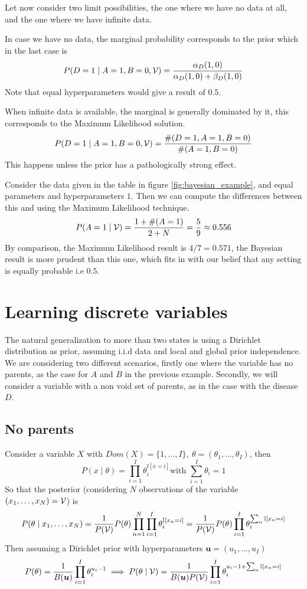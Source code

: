 Let now consider two limit possibilities, the one where we have no data at all,
and the one where we have infinite data.

In case we have no data, the marginal probability corresponds to the prior which
in the last case is
\[
   P(D = 1 \mid A = 1, B = 0, \mathcal{V}) = \frac{\alpha_{D}(1,0)}{\alpha_{D}(1,0) + \beta_{D}(1,0)}
 \]
 Note that equal hyperparameters would give a result of \(0.5\).

 When infinite data is available, the marginal is generally dominated by it,
 this corresponds to the Maximum Likelihood solution.
 \[
   P(D = 1 \mid A = 1, B = 0, \mathcal{V}) = \frac{\#(D = 1, A = 1 , B = 0)}{\#(A = 1, B = 0)}
 \]
 This happens unless the prior has a pathologically strong effect.

 Consider the data given in the table in figure \ref{fig:bayesian_example}, and
 equal parameters and hyperparameters \(1\). Then we can compute the differences
 between this and using the Maximum Likelihood technique.
 \[
   P(A = 1 \mid \mathcal{V}) = \frac{1 + \#(A = 1)}{2 + N} = \frac{5}{9} \approx 0.556
 \]
 By comparison, the Maximum Likelihood result is \(4/7 = 0.571\), the Bayesian
 result is more prudent than this one, which fits in with our belief that any
 setting is equally probable i.e \(0.5\).

 \section{Learning discrete variables}

 The natural generalization to more than two states is using a Dirichlet
 distribution as prior, assuming i.i.d data and local and global prior
 independence. We are considering two different scenarios, firstly one where the
 variable has no parents, as the case for \(A\) and \(B\) in the previous
 example. Secondly, we will consider a variable with a non void set of parents,
 as in the case with the disease \(D\).

 \subsection{No parents}

 Consider a variable \(X\) with
 \(Dom(X) = \{1, \dots, I\}, \ \theta = (\theta_{1},\dots, \theta_{I})\), then
 \[
   P(x \mid \theta) = \prod_{i = 1}^{I}\theta_{i}^{\mathbb{I}[x = i]} \text{
   with  } \sum_{i=1}^{I}\theta_{i} = 1
\]
So that the posterior (considering \(N\) observations of the variable
\((x_{1}, \dots, x_{N}) = \mathcal{V}\)) is
\[
  P(\theta \mid x_{1},\dots,x_{N}) = \frac{1}{P(\mathcal{V})} P(\theta) \prod_{n = 1}^{N}\prod_{i =1 }^{I}\theta_{i}^{\mathbb{I}[x_{n} = i]} =  \frac{1}{P(\mathcal{V})} P(\theta) \prod_{i = 1}^{I} \theta_{i}^{\sum_{n} \mathbb{I}[x_{n}=i]}
\]
Then assuming a Dirichlet prior with hyperparameters \(\bm{u} = (u_{1}, \dots, u_{I})\)
\[
  P(\theta) = \frac{1}{B(\bm{u})}\prod_{i =1}^{I}\theta_{i}^{u_{i}-1} \implies P(\theta \mid \mathcal{V}) = \frac{1}{B(\bm{u})P(\mathcal{V})}\prod_{i=1}^{I}\theta_{i}^{u_{i}-1 + \sum_{n}\mathbb{I}[x_{n} = i]}
\]

